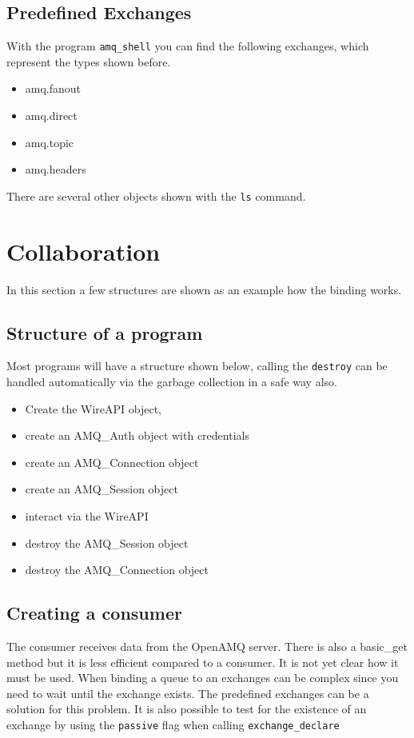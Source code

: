 \documentclass[a4paper,twoside]{article}
\begin{document}
\subsection{Predefined Exchanges}
With the program {\tt amq\_shell}  you 
can find the following exchanges, which represent 
the types shown before. 
\begin{itemize}
  \item amq.fanout 
  \item amq.direct 
  \item amq.topic  
  \item amq.headers    
\end{itemize}

There are several other objects shown with the {\tt ls}
command.


\section{Collaboration}

In this section a few structures are shown as an example how
the binding works.

\subsection{Structure of a program}
Most programs will have a structure shown below, 
calling the {\tt destroy} can be handled automatically
via the garbage collection in a safe way also.

\begin{itemize}
\item Create the WireAPI object,
\item create an AMQ\_Auth object with credentials
\item create an AMQ\_Connection object 
\item create an AMQ\_Session object
\item interact via the WireAPI
\item destroy the AMQ\_Session object
\item destroy the AMQ\_Connection object
\end{itemize}


\subsection{Creating a consumer}
The consumer receives data from the OpenAMQ server. 
There is also a basic\_get method but it is less 
efficient compared to a consumer.  It is not yet 
clear how it must be used. When binding a queue 
to an exchanges can be complex since you need to wait 
until the exchange exists. 
The predefined exchanges can be a solution for this
problem. It is also possible to test for the
existence of an exchange by using the {\tt passive} flag
when calling {\tt exchange\_declare}
\end{document}
